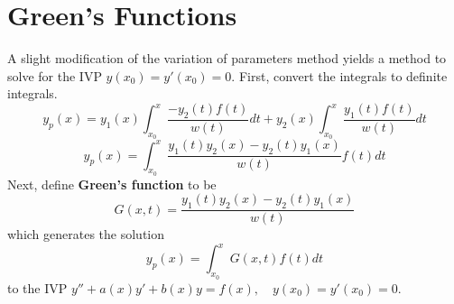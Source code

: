 \documentclass[11pt]{article}
\begin{document}
\section{Green's Functions}
	A slight modification of the variation of parameters method yields a method to solve for the IVP $y(x_0) = y'(x_0) = 0$. First, convert the integrals to definite integrals.
	\begin{equation}
		y_p(x) = y_1(x) \int_{x_0}^x\frac{-y_2(t) f(t)}{w(t)}dt + y_2(x)\int_{x_0}^x\frac{y_1(t) f(t)}{w(t)}dt
	\end{equation}
	\begin{equation}
		y_p(x) = \int_{x_0}^x \frac{y_1(t) y_2(x) - y_2(t) y_1(x)}{w(t)}f(t)dt
	\end{equation}
	Next, define \textbf{Green's function} to be
	\begin{equation}
		G(x, t) = \frac{y_1(t) y_2(x) - y_2(t) y_1(x)}{w(t)}
	\end{equation}
	which generates the solution
	\begin{equation}
		y_p(x) = \int_{x_0}^x G(x,t)f(t)dt
	\end{equation}
	to the IVP $y'' + a(x)y' + b(x)y = f(x), \quad y(x_0) = y'(x_0) = 0$.
	

%		
%		


\end{document}
